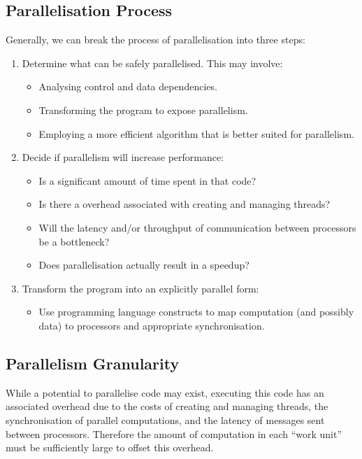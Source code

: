 \documentclass{article}
\begin{document}
\subsection{Parallelisation Process}
Generally, we can break the process of parallelisation into three
steps:
\begin{enumerate}
    \item Determine what can be safely parallelised. This may involve:
          \begin{itemize}
              \item Analysing control and data dependencies.
              \item Transforming the program to expose parallelism.
              \item Employing a more efficient algorithm that is better
                    suited for parallelism.
          \end{itemize}
    \item Decide if parallelism will increase performance:
          \begin{itemize}
              \item Is a significant amount of time spent in that code?
              \item Is there a overhead associated with creating and
                    managing threads?
              \item Will the latency and/or throughput of communication
                    between processors be a bottleneck?
              \item Does parallelisation actually result in a speedup?
          \end{itemize}
    \item Transform the program into an explicitly parallel form:
          \begin{itemize}
              \item Use programming language constructs to map
                    computation (and possibly data) to processors and
                    appropriate synchronisation.
          \end{itemize}
\end{enumerate}
\subsection{Parallelism Granularity}
While a potential to parallelise code may exist, executing this code
has an associated overhead due to the costs of creating and managing
threads, the synchronisation of parallel computations, and the latency
of messages sent between processors. Therefore the amount of
computation in each ``work unit'' must be sufficiently large to offset
this overhead.
\end{document}

